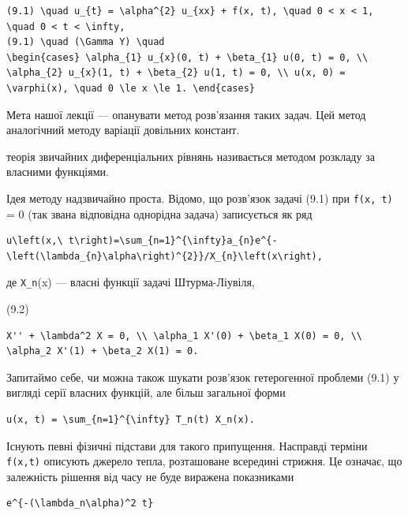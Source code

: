 \documentclass[
  ukrainian,
]{article}
\begin{document}
\begin{verbatim}
(9.1) \quad u_{t} = \alpha^{2} u_{xx} + f(x, t), \quad 0 < x < 1, \quad 0 < t < \infty,
(9.1) \quad (\Gamma Y) \quad
\begin{cases} \alpha_{1} u_{x}(0, t) + \beta_{1} u(0, t) = 0, \\ \alpha_{2} u_{x}(1, t) + \beta_{2} u(1, t) = 0, \\ u(x, 0) = \varphi(x), \quad 0 \le x \le 1. \end{cases}
\end{verbatim}

Мета нашої лекції --- опанувати метод розв'язання таких задач. Цей метод
аналогічний методу варіації довільних констант.

теорія звичайних диференціальних рівнянь називається методом розкладу за
власними функціями.

Ідея методу надзвичайно проста. Відомо, що розв'язок задачі (9.1) при
\texttt{f(x,\ t)} = 0 (так звана відповідна однорідна задача)
записується як ряд

\begin{verbatim}
u\left(x,\ t\right)=\sum_{n=1}^{\infty}a_{n}e^{-\left(\lambda_{n}\alpha\right)^{2}}/X_{n}\left(x\right),
\end{verbatim}

де \texttt{X\_n}(x) --- власні функції задачі Штурма-Ліувіля,

(9.2)

\begin{verbatim}
X'' + \lambda^2 X = 0, \\ \alpha_1 X'(0) + \beta_1 X(0) = 0, \\ \alpha_2 X'(1) + \beta_2 X(1) = 0.
\end{verbatim}

Запитаймо себе, чи можна також шукати розв'язок гетерогенної проблеми
(9.1) у вигляді серії власних функцій, але більш загальної форми

\begin{verbatim}
u(x, t) = \sum_{n=1}^{\infty} T_n(t) X_n(x).
\end{verbatim}

Існують певні фізичні підстави для такого припущення. Насправді терміни
\texttt{f(x,t)} описують джерело тепла, розташоване всередині стрижня.
Це означає, що залежність рішення від часу не буде виражена показниками

\begin{verbatim}
e^{-(\lambda_n\alpha)^2 t}
\end{verbatim}
\end{document}
